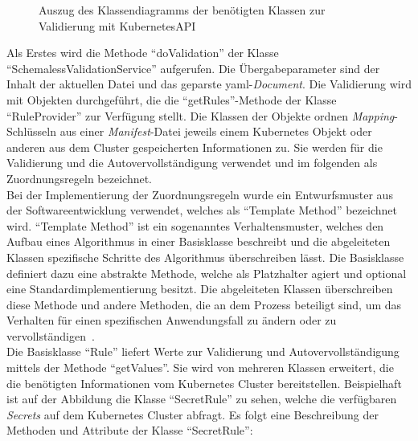 \begin{figure}[htp] %
  \centering
  \caption{Auszug des Klassendiagramms der benötigten Klassen zur Validierung mit KubernetesAPI}
  \label{fig:class-diagram-yaml-language-service-validation-kubernetes}
\end{figure}

Als Erstes wird die Methode ``doValidation'' der Klasse ``SchemalessValidationService'' aufgerufen.
Die Übergabeparameter sind der Inhalt der aktuellen Datei und das geparste \ac{yaml}-\textit{Document}.
Die Validierung wird mit Objekten durchgeführt, die die ``getRules''-Methode der Klasse ``RuleProvider'' zur Verfügung stellt.
Die Klassen der Objekte ordnen \textit{Mapping}-Schlüsseln aus einer \textit{Manifest}-Datei jeweils
einem Kubernetes Objekt oder anderen aus dem Cluster gespeicherten Informationen zu.
Sie werden für die Validierung und die Autovervollständigung verwendet und im folgenden als Zuordnungsregeln bezeichnet.
\\
Bei der Implementierung der Zuordnungsregeln wurde ein Entwurfsmuster aus der Softwareentwicklung verwendet, welches als ``Template Method'' bezeichnet wird.
``Template Method'' ist ein sogenanntes Verhaltensmuster, welches den Aufbau eines Algorithmus in einer Basisklasse beschreibt und
die abgeleiteten Klassen spezifische Schritte des Algorithmus überschreiben lässt.
Die Basisklasse definiert dazu eine abstrakte Methode, welche als Platzhalter agiert und optional eine Standardimplementierung besitzt.
Die abgeleiteten Klassen überschreiben diese Methode und andere Methoden, die an dem Prozess beteiligt sind, um
das Verhalten für einen spezifischen Anwendungsfall zu ändern oder zu vervollständigen~\cite{typescript-design-pattern-chapter-6,design-patterns-refactoring-guru}.
\\
Die Basisklasse ``Rule'' liefert Werte zur Validierung und Autovervollständigung mittels der Methode ``getValues''.
Sie wird von mehreren Klassen erweitert, die die benötigten Informationen vom Kubernetes Cluster bereitstellen.
Beispielhaft ist auf der Abbildung die Klasse ``SecretRule'' zu sehen, welche die verfügbaren \textit{Secrets} auf dem Kubernetes Cluster abfragt.
Es folgt eine Beschreibung der Methoden und Attribute der Klasse ``SecretRule'':
